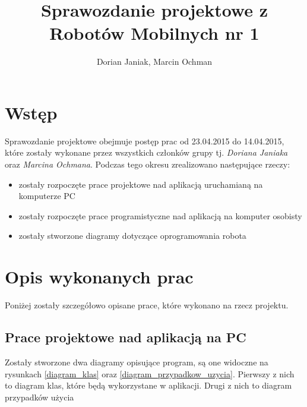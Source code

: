 \documentclass[a4paper]{article}
\author{Dorian Janiak, Marcin Ochman}
\title{Sprawozdanie projektowe z Robotów Mobilnych nr 1}
\begin{document}
\maketitle

\newpage

\tableofcontents
\listoffigures

\newpage

\section{Wstęp}

Sprawozdanie projektowe obejmuje postęp prac od 23.04.2015 do 14.04.2015, które zostały wykonane przez wszystkich członków grupy tj. \textit{Doriana Janiaka} oraz \textit{Marcina Ochmana}. Podczas tego okresu zrealizowano następujące rzeczy:
\begin{itemize}
	\item zostały rozpoczęte prace projektowe nad aplikacją uruchamianą na komputerze PC
	\item zostały rozpoczęte prace programistyczne nad aplikacją na komputer osobisty
	\item zostały stworzone diagramy dotyczące oprogramowania robota
\end{itemize}


\section{Opis wykonanych prac}

Poniżej zostały szczegółowo opisane prace, które wykonano na rzecz projektu.

\subsection{Prace projektowe nad aplikacją na PC}

Zostały stworzone dwa diagramy opisujące program, są one widoczne na rysunkach \ref{diagram_klas} oraz \ref{diagram_przypadkow_uzycia}. Pierwszy z nich to diagram klas, które będą wykorzystane w aplikacji. Drugi z nich to diagram przypadków użycia
\end{document}
